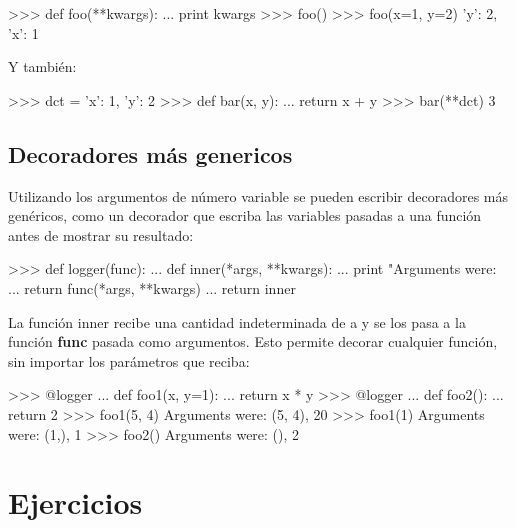\begin{pyglist} [language=python]
>>> def foo(**kwargs):
...     print kwargs
>>> foo()
{}
>>> foo(x=1, y=2)
{'y': 2, 'x': 1}
\end{pyglist}

Y también:\\

\begin{pyglist} [language=python]
>>> dct = {'x': 1, 'y': 2}
>>> def bar(x, y):
...     return x + y
>>> bar(**dct)
3
\end{pyglist}

\subsection{Decoradores más genericos}

Utilizando los argumentos de número variable se pueden escribir decoradores más genéricos, como un decorador que escriba las variables pasadas a una función antes de mostrar su resultado:\\

\begin{pyglist} [language=python]
>>> def logger(func):
...     def inner(*args, **kwargs): 
...         print "Arguments were: %
...         return func(*args, **kwargs)
...     return inner
\end{pyglist}

La función inner recibe una cantidad indeterminada de a y se los pasa a la función \textbf{func} pasada como argumentos. Esto permite decorar cualquier función, sin importar los parámetros que reciba:\\

\begin{pyglist} [language=python]
>>> @logger
... def foo1(x, y=1):
...     return x * y
>>> @logger
... def foo2():
...     return 2
>>> foo1(5, 4)
Arguments were: (5, 4), {}
20
>>> foo1(1)
Arguments were: (1,), {}
1
>>> foo2()
Arguments were: (), {}
2
\end{pyglist}

\newpage

\section{Ejercicios}

